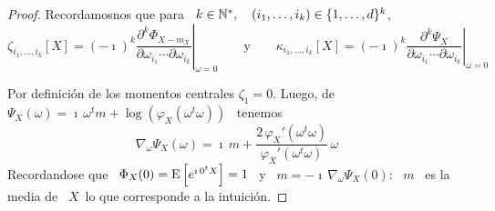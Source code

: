 \begin{proof}
  Recordamosnos que para \ $k \in \mathbb{N}^*, \quad (i_1 , \ldots , i_k) \in \{ 1 ,
  \ldots , d \}^k$,
  \[
  \zeta_{i_1,\ldots,i_k}[X]     =     (-    \imath)^k     \left.\frac{\partial^k
      \Phi_{X-m_X}}{\partial         \omega_{i_1}         \cdots        \partial
      \omega_{i_k}}\right|_{\omega=0}        \qquad        \mbox{y}       \qquad
  \kappa_{i_1,\ldots,i_k}[X]     =    (-     \imath)^k    \left.\frac{\partial^k
      \Psi_X}{\partial           \omega_{i_1}           \cdots          \partial
      \omega_{i_k}}\right|_{\omega=0}
  \]
  
  Por  definici\'on  de  los  momentos  centrales  $\zeta_1  =  0$.   Luego,  de
  $\Psi_X(\omega)  =  \imath \,  \omega^t  m  +  \log\left( \varphi_X(  \omega^t
    \omega) \right)$ \ tenemos
  \[
  \nabla_\omega \Psi_X(\omega) =  \imath \, m + \frac{2  \, \varphi_X'( \omega^t
    \omega)}{\varphi_X'( \omega^t \omega)} \, \omega
  \]
  Recordandose que \ $\Phi_X(0) = \operatorname{E}\left[  e^{\imath \, 0^t X} \right] = 1$ \
  y \ $m =  - \imath \, \nabla_\omega \Psi_X(0)$: \ $m$ \ es  la media de \ $X$\
  lo que corresponde a la intuici\'on.


\end{proof}

